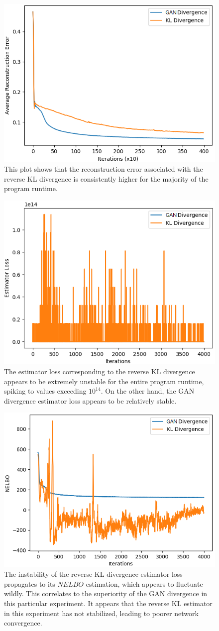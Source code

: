 \documentclass[honours,12pt, twoside]{unswthesis}
\numberwithin{equation}{section}
\theoremstyle{definition}
\begin{document}
\begin{figure}[h]
\centering
\includegraphics[width=0.49\linewidth]{part4reconerrors/PCADVvsPCKLD.png}
\caption{\small This plot shows that the reconstruction error associated with the reverse KL divergence is consistently higher for the majority of the program runtime.}
\end{figure}
\begin{figure}[h]
\centering
\includegraphics[width=0.49\linewidth]{part4estimatorlosses/PCADVvsPCKLD.png}
\caption{\small The estimator loss corresponding to the reverse KL divergence appears to be extremely unstable for the entire program runtime, spiking to values exceeding $10^{14}$. On the other hand, the GAN divergence estimator loss appears to be relatively stable.}
\end{figure}
\begin{figure}[h]
\centering
\includegraphics[width=0.49\linewidth]{part4nelbos/PCADVvsPCKLD.png}
\caption{\small The instability of the reverse KL divergence estimator loss propagates to its $NELBO$ estimation, which appears to fluctuate wildly. This correlates to the superiority of the GAN divergence in this particular experiment. It appears that the reverse KL estimator in this experiment has not stabilized, leading to poorer network convergence.}
\end{figure}
\end{document}

